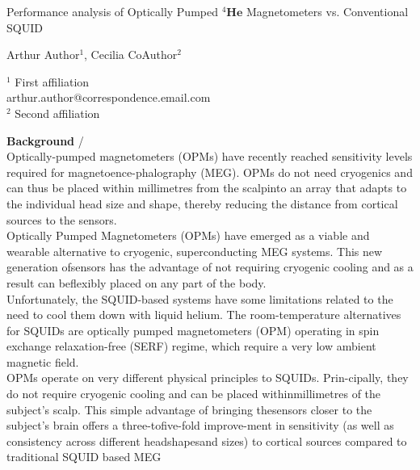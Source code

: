 \documentclass[a4paper]{article}
\begin{document}

\Large
 \begin{center}
 Performance analysis of Optically Pumped ${}^{4}\mathbf{He}$ Magnetometers vs. Conventional SQUID\\ 

\hspace{10pt}

\large
Arthur Author$^1$, Cecilia CoAuthor$^2$ \\

\hspace{10pt}

\small  
$^1$ First affiliation\\
arthur.author@correspondence.email.com\\
$^2$ Second affiliation

\end{center}

\hspace{10pt}

\normalsize
\textbf{Background} / \\

Optically-pumped magnetometers (OPMs) have recently reached sensitivity levels required for magnetoence-phalography (MEG). OPMs do not need cryogenics and can thus be placed within millimetres from the scalpinto an array that adapts to the individual head size and shape, thereby reducing the distance from cortical sources to the sensors.\\
Optically Pumped Magnetometers (OPMs) have emerged as a viable and wearable alternative to cryogenic, superconducting MEG systems. This new generation ofsensors has the advantage of not requiring cryogenic cooling and as a result can beflexibly placed on any part of the body. \\

Unfortunately, the SQUID-based systems have some limitations related to the need to cool them down with liquid helium. The room-temperature alternatives for SQUIDs are optically pumped magnetometers (OPM) operating in spin exchange relaxation-free (SERF) regime, which require a very low ambient magnetic field.\\

OPMs operate on very different physical principles to SQUIDs. Prin-cipally, they do not require cryogenic cooling and can be placed withinmillimetres of the subject's scalp. This simple advantage of bringing thesensors closer to the subject's brain offers a three-tofive-fold improve-ment in sensitivity (as well as consistency across different headshapesand sizes) to cortical sources compared to traditional SQUID based MEG \\
\end{document}
